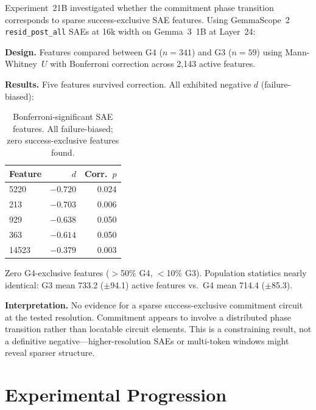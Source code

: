 \documentclass[11pt,twocolumn]{article}
\newcommand{\groupthree}{\textsc{G3}}
\newcommand{\groupfour}{\textsc{G4}}
\begin{document}
Experiment~21B investigated whether the commitment phase transition corresponds to sparse success-exclusive SAE features. Using GemmaScope~2 \texttt{resid\_post\_all} SAEs at 16k width on Gemma~3~1B at Layer~24:

\textbf{Design.} Features compared between \groupfour{} ($n = 341$) and \groupthree{} ($n = 59$) using Mann-Whitney~$U$ with Bonferroni correction across 2,143 active features.

\textbf{Results.} Five features survived correction. All exhibited negative $d$ (failure-biased):

\begin{table}[h]
\centering
\small
\begin{tabular}{lrr}
\toprule
\textbf{Feature} & \textbf{$d$} & \textbf{Corr.\ $p$} \\
\midrule
5220 & $-0.720$ & 0.024 \\
213 & $-0.703$ & 0.006 \\
929 & $-0.638$ & 0.050 \\
363 & $-0.614$ & 0.050 \\
14523 & $-0.379$ & 0.003 \\
\bottomrule
\end{tabular}
\caption{Bonferroni-significant SAE features. All failure-biased; zero success-exclusive features found.}
\label{tab:sae}
\end{table}

Zero G4-exclusive features ($>$50\% G4, $<$10\% G3). Population statistics nearly identical: G3 mean 733.2 ($\pm$94.1) active features vs.\ G4 mean 714.4 ($\pm$85.3).

\textbf{Interpretation.} No evidence for a sparse success-exclusive commitment circuit at the tested resolution. Commitment appears to involve a distributed phase transition rather than locatable circuit elements. This is a constraining result, not a definitive negative---higher-resolution SAEs or multi-token windows might reveal sparser structure.


\section{Experimental Progression}
\label{app:experiments}
\end{document}
